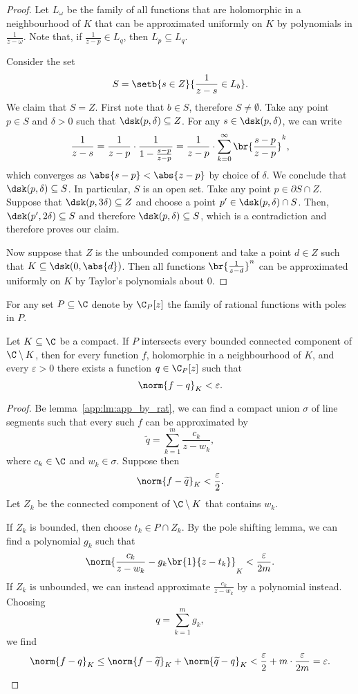 \begin{proof}
Let $L_\omega$ be the family of all functions that are holomorphic
in a neighbourhood of $K$ that can be approximated uniformly on $K$
by polynomials in $\frac{1}{z-\omega}$. Note that, if
$\frac{1}{z-p} \in L_q$, then $L_p \subseteq L_q$.

Consider the set
\[
S = \setb{s \in Z}{\frac{1}{z-s} \in L_b}.
\]
We claim that $S = Z$. First note that $b \in S$, therefore
$S \ne \emptyset$. Take any point $p \in S$ and $\delta > 0$ such
that $\dsk(p, \delta) \subseteq Z$. For any
$s \in \dsk(p, \delta)$, we can write
\[
\frac{1}{z-s} =
\frac{1}{z-p} \cdot \frac{1}{1 - \frac{s-p}{z-p}} =
\frac{1}{z-p} \cdot \sum_{k=0}^\infty
\br{\frac{s-p}{z-p}}^k,
\]
which converges as $\abs{s-p} < \abs{z-p}$ by choice of $\delta$.
We conclude that $\dsk(p, \delta) \subseteq S$. In particular, $S$
is an open set. Take any point $p \in \partial S \cap Z$. Suppose
that $\dsk(p, 3 \delta) \subseteq Z$ and choose a point
$p' \in \dsk(p, \delta) \cap S$. Then,
$\dsk(p', 2\delta) \subseteq S$ and therefore
$\dsk(p, \delta) \subseteq S$, which is a contradiction and
therefore proves our claim.

Now suppose that $Z$ is the unbounded component and take a point
$d \in Z$ such that $K \subseteq \dsk(0, \abs{d})$. Then all
functions $\br{\frac{1}{z-d}}^n$ can be approximated uniformly on
$K$ by Taylor's polynomials about $0$.
\end{proof}

\begin{definicija}
For any set $P \subseteq \C$ denote by $\C_P[z]$ the family of
rational functions with poles in $P$.
\end{definicija}

\begin{izrek}
\label{app:thm:runge_app}
Let $K \subseteq \C$ be a compact. If $P$ intersects every bounded
connected component of $\C \setminus K$, then for every function
$f$, holomorphic in a neighbourhood of $K$, and every
$\varepsilon > 0$ there exists a function $q \in \C_P[z]$ such that
\[
\norm{f-q}_K < \varepsilon.
\]
\end{izrek}

\begin{proof}
Be lemma~\ref{app:lm:app_by_rat}, we can find a compact union
$\sigma$ of line segments such that every such $f$ can be
approximated by
\[
\widetilde{q} = \sum_{k=1}^m \frac{c_k}{z - w_k},
\]
where $c_k \in \C$ and $w_k \in \sigma$. Suppose then
\[
\norm{f - \widetilde{q}}_K < \frac{\varepsilon}{2}.
\]
Let $Z_k$ be the connected component of $\C \setminus K$ that
contains $w_k$.

If $Z_k$ is bounded, then choose $t_k \in P \cap Z_k$. By the pole
shifting lemma, we can find a polynomial $g_k$ such that
\[
\norm{\frac{c_k}{z - w_k} - g_k \br{1}{z - t_k}}_K <
\frac{\varepsilon}{2m}.
\]
If $Z_k$ is unbounded, we can instead approximate
$\frac{c_k}{z - w_k}$ by a polynomial instead. Choosing
\[
q = \sum_{k=1}^m g_k,
\]
we find
\[
\norm{f - q}_K \leq
\norm{f - \widetilde{q}}_K + \norm{\widetilde{q} - q}_K <
\frac{\varepsilon}{2} + m \cdot \frac{\varepsilon}{2m} =
\varepsilon. \qedhere
\]
\end{proof}

